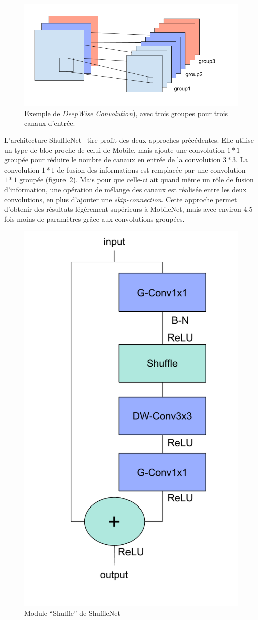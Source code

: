 \begin{figure}%
\centering
\includegraphics[width=\columnwidth]{figures/groupConvolution.png}%
\caption{Exemple de \textit{DeepWise Convolution}), avec trois groupes pour trois canaux d'entrée.}%
\label{fig:groupConv}%
\end{figure}

L'architecture ShuffleNet~\cite{zhang2017shufflenet} tire profit des deux approches précédentes.
Elle utilise un type de bloc proche de celui de Mobile, mais ajoute une convolution $1*1$ groupée pour réduire le nombre de canaux en entrée de la convolution $3*3$.
La convolution $1*1$ de fusion des informations est remplacée par une convolution $1*1$ groupée (figure~\ref{fig:shufflemodule}). 
Mais pour que celle-ci ait quand même un rôle de fusion d'information, une opération de mélange des canaux est réalisée entre les deux convolutions, en plus d'ajouter une \textit{skip-connection}.
Cette approche permet d'obtenir des résultats légèrement supérieurs à MobileNet, mais avec environ $4.5$ fois moins de paramètres grâce aux convolutions groupées.


\begin{figure}%
\centering
\includegraphics[width=.35\columnwidth]{figures/ShuffleModule.pdf}%
\caption{Module ``Shuffle'' de ShuffleNet~\cite{zhang2017shufflenet}}%
\label{fig:shufflemodule}%
\end{figure}

